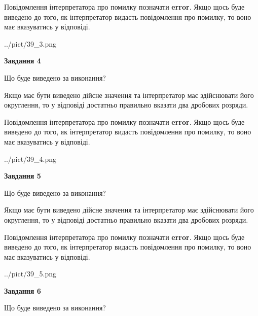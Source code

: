 \documentclass[12pt, ukrainian]{article}
\begin{document}
{\begin {Large}
Повідомлення інтерпретатора про помилку позначати \textbf{error}.
Якщо щось буде виведено до того, як інтерпретатор видасть повідомлення про помилку, 
то воно має вказуватись у відповіді. \par

\begin{center}
	{../pict/39_3.png}
\end{center}
\newpage

{\begin {center}\textbf{Завдання 4}\end {center}}\par
Що буде виведено за виконання? \par

Якщо має бути виведено дійсне значення та інтерпретатор має здійснювати його округлення, 
то у відповіді достатньо правильно вказати два дробових розряди.

Повідомлення інтерпретатора про помилку позначати \textbf{error}.
Якщо щось буде виведено до того, як інтерпретатор видасть повідомлення про помилку, 
то воно має вказуватись у відповіді. \par

\begin{center}
	{../pict/39_4.png}
\end{center}
\newpage

{\begin {center}\textbf{Завдання 5}\end {center}}\par
Що буде виведено за виконання? \par

Якщо має бути виведено дійсне значення та інтерпретатор має здійснювати його округлення, 
то у відповіді достатньо правильно вказати два дробових розряди.

Повідомлення інтерпретатора про помилку позначати \textbf{error}.
Якщо щось буде виведено до того, як інтерпретатор видасть повідомлення про помилку, 
то воно має вказуватись у відповіді. \par

\begin{center}
	{../pict/39_5.png}
\end{center}
\newpage

{\begin {center}\textbf{Завдання 6}\end {center}}\par
Що буде виведено за виконання? \par


\end{Large}}
\end{document}
